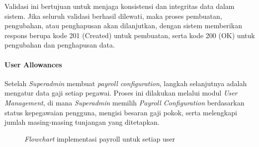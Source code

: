 Validasi ini bertujuan untuk menjaga konsistensi dan integritas data dalam sistem. Jika seluruh validasi berhasil dilewati, maka proses pembuatan, pengubahan, atau penghapusan akan dilanjutkan, dengan sistem memberikan respons berupa kode 201 (Created) untuk pembuatan, serta kode 200 (OK) untuk pengubahan dan penghapusan data.

\paragraph{User Allowances}
Setelah \textit{Superadmin} membuat \textit{payroll configuration}, langkah selanjutnya adalah mengatur data gaji setiap pegawai. Proses ini dilakukan melalui modul \textit{User Management}, di mana \textit{Superadmin} memilih \textit{Payroll Configuration} berdasarkan status kepegawaian pengguna, mengisi besaran gaji pokok, serta melengkapi jumlah masing-masing tunjangan yang ditetapkan. 

\begin{figure}[H]
    \centering
    \caption{\textit{Flowchart} implementasi payroll untuk setiap user}
    \label{fig:payroll_untuk_setiap_user}
\end{figure}

